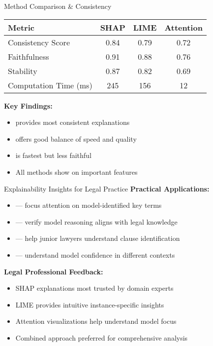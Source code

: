 \begin{frame}{Method Comparison \& Consistency}
\begin{table}[h]
\centering
\begin{tabular}{@{}lccc@{}}
\toprule
\textbf{Metric} & \textbf{SHAP} & \textbf{LIME} & \textbf{Attention} \\
\midrule
Consistency Score & 0.84 & 0.79 & 0.72 \\
Faithfulness & 0.91 & 0.88 & 0.76 \\
Stability & 0.87 & 0.82 & 0.69 \\
Computation Time (ms) & 245 & 156 & 12 \\
\bottomrule
\end{tabular}
\end{table}

\vspace{0.5cm}
\textbf{Key Findings:}
\begin{itemize}
    \item {} provides most consistent explanations
    \item {} offers good balance of speed and quality
    \item {} is fastest but less faithful
    \item All methods show  on important features
\end{itemize}
\end{frame}

\begin{frame}{Explainability Insights for Legal Practice}
\textbf{Practical Applications:}
\begin{itemize}
    \item {} --- focus attention on model-identified key terms
    \item {} --- verify model reasoning aligns with legal knowledge
    \item {} --- help junior lawyers understand clause identification
    \item {} --- understand model confidence in different contexts
\end{itemize}

\vspace{0.5cm}
\textbf{Legal Professional Feedback:}
\begin{itemize}
    \item SHAP explanations most trusted by domain experts
    \item LIME provides intuitive instance-specific insights
    \item Attention visualizations help understand model focus
    \item Combined approach preferred for comprehensive analysis
\end{itemize}
\end{frame}
